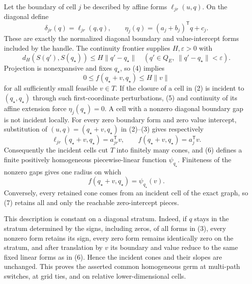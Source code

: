 Let the boundary of cell \(j\) be described by affine forms \(\ell_{jr}(u,q)\).  On the diagonal define
\[
\delta_{jr}(q)=\ell_{jr}(q,q),\qquad
\eta_j(q)=(a_j+b_j)^{\mathsf T}q+c_j.
\tag{3}
\]
These are exactly the normalized diagonal boundary and value-intercept forms included by the handle.  The continuity frontier supplies \(H,\varepsilon>0\) with
\[
d_H(S(q'),S(q_\star))\le H\|q'-q_\star\|
\quad(q'\in Q_E,\ \|q'-q_\star\|<\varepsilon).
\tag{4}
\]
Projection is nonexpansive and fixes \(q_\star\), so (4) implies
\[
0\le f(q_\star+v,q_\star)\le H\|v\|
\tag{5}
\]
for all sufficiently small feasible \(v\in T\).  If the closure of a cell in (2) is incident to \((q_\star,q_\star)\) through such first-coordinate perturbations, (5) and continuity of its affine extension force \(\eta_j(q_\star)=0\).  A cell with a nonzero diagonal boundary gap is not incident locally.  For every zero boundary form and zero value intercept, substitution of \((u,q)=(q_\star+v,q_\star)\) in (2)--(3) gives respectively
\[
\ell_{jr}(q_\star+v,q_\star)=a_{jr}^{\mathsf T}v,\qquad
f(q_\star+v,q_\star)=a_j^{\mathsf T}v.
\tag{6}
\]
Consequently the incident cells cut \(T\) into finitely many cones, and (6) defines a finite positively homogeneous piecewise-linear function \(\psi_{q_\star}\).  Finiteness of the nonzero gaps gives one radius on which
\[
f(q_\star+v,q_\star)=\psi_{q_\star}(v).
\tag{7}
\]
Conversely, every retained cone comes from an incident cell of the exact graph, so (7) retains all and only the reachable zero-intercept pieces.

This description is constant on a diagonal stratum.  Indeed, if \(q\) stays in the stratum determined by the signs, including zeros, of all forms in (3), every nonzero form retains its sign, every zero form remains identically zero on the stratum, and after translation by \(v\) its boundary and value reduce to the same fixed linear forms as in (6).  Hence the incident cones and their slopes are unchanged.  This proves the asserted common homogeneous germ at multi-path switches, at grid ties, and on relative lower-dimensional cells.

